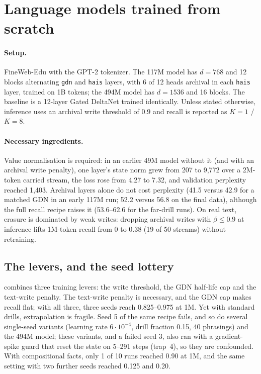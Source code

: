 \documentclass[11pt]{article}
\begin{document}
\section{Language models trained from scratch}
\label{sec:lm}
\paragraph{Setup.} FineWeb-Edu with the GPT-2 tokenizer. The 117M model has $d = 768$ and 12 blocks alternating \texttt{gdn} and \texttt{hais} layers, with 6 of 12 heads archival in each \texttt{hais} layer, trained on 1B tokens; the 494M model has $d = 1536$ and 16 blocks. The baseline is a 12-layer Gated DeltaNet trained identically. Unless stated otherwise, inference uses an archival write threshold of 0.9 and recall is reported as $K = 1$ / $K = 8$.

\paragraph{Necessary ingredients.} Value normalisation is required: in an earlier 49M model without it (and with an archival write penalty), one layer's state norm grew from 207 to 9{,}772 over a 2M-token carried stream, the loss rose from 4.27 to 7.32, and validation perplexity reached 1{,}403. Archival layers alone do not cost perplexity (41.5 versus 42.9 for a matched GDN in an early 117M run; 52.2 versus 56.8 on the final data), although the full recall recipe raises it (53.6--62.6 for the far-drill runs). On real text, erasure is dominated by weak writes: dropping archival writes with $\beta \le 0.9$ at inference lifts 1M-token recall from 0 to 0.38 (19 of 50 streams) without retraining.

\subsection{The levers, and the seed lottery}
\label{sec:levers}
 combines three training levers: the write threshold, the GDN half-life cap and the text-write penalty. The text-write penalty is necessary, and the GDN cap makes recall flat; with all three, three seeds reach 0.825--0.975 at 1M. Yet with standard drills, extrapolation is fragile. Seed 5 of the same recipe fails, and so do several single-seed variants (learning rate $6\cdot10^{-4}$, drill fraction 0.15, 40 phrasings) and the 494M model; these variants, and a failed seed 3, also ran with a gradient-spike guard that reset the state on 5--291 steps (trap~4), so they are confounded. With compositional facts, only 1 of 10 runs reached 0.90 at 1M, and the same setting with two further seeds reached 0.125 and 0.20.
\end{document}
